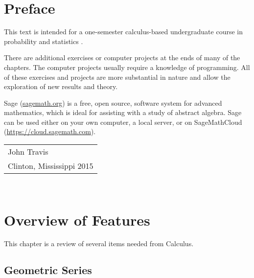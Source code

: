 \documentclass[10pt,]{book}
\theoremstyle{plain}
\theoremstyle{definition}
\theoremstyle{definition}
\numberwithin{equation}{section}
\begin{document}
\chapter*{Preface}\label{preface-1}
This text is intended for a one-semester calculus-based undergraduate course in probability and statistics .%
\par
There are additional exercises or computer projects at the ends of many of the chapters. The computer projects usually require a knowledge of programming. All of these exercises and projects are more substantial in nature and allow the exploration of new results and theory.%
\par
Sage (\href{http://sagemath.org}{sagemath.org}) is a free, open source, software system for advanced mathematics, which is ideal for assisting with a study of abstract algebra. Sage can be used either on your own computer, a local server, or on SageMathCloud (\href{https://cloud.sagemath.com}{https://cloud.sagemath.com}). %
\par\hfill\begin{tabular}{l@{}}
John Travis\\
Clinton, Mississippi  2015
\end{tabular}\\\par
\setcounter{tocdepth}{1}
\renewcommand*\contentsname{Contents}
\tableofcontents
\mainmatter
\typeout{************************************************}
\typeout{************************************************}
\chapter[Overview of Features]{Overview of Features}\label{PowerSeriesOverview}
\typeout{************************************************}
\typeout{************************************************}
This chapter is a review of several items needed from Calculus.%
\typeout{************************************************}
\typeout{************************************************}
\section[Geometric Series]{Geometric Series}\label{GeometricSeries}
\end{document}
